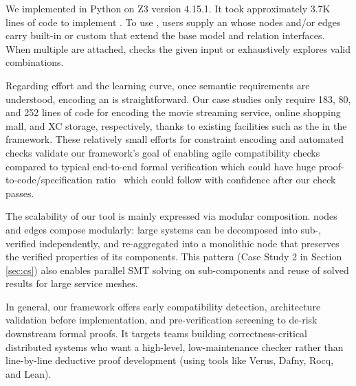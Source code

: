 We implemented \sysname{} in Python on Z3 version 4.15.1. It took
approximately 3.7K lines of code to implement \sysname{}. 
%
To use \sysname{}, users supply an \sysgraph whose nodes and/or edges carry
built-in or custom \sysmods that extend the base model and relation interfaces.
When multiple \sysmods are attached, \sysname checks the given
input or exhaustively explores valid combinations.


Regarding effort and the learning curve, once semantic requirements are understood, encoding an \sysgraph is straightforward.
Our case studies only require 183, 80, and 252 lines of code for encoding the movie streaming service, online shopping mall, and XC storage, respectively, thanks to existing facilities such as the \sysmods{} in the \sysname{} framework. 
These relatively small efforts for constraint encoding and automated checks validate our framework's goal of enabling agile compatibility checks compared to typical end-to-end formal verification which could have huge proof-to-code/specification ratio~\cite{certikos-osdi16, klein2009sel4, wormspace, ironfleet, disel} which could follow with confidence after our \sysname{} check passes. 

The scalability of our tool is mainly expressed via modular composition.
\sysgraph nodes and edges compose modularly: large systems can be decomposed into sub-\sysgraphs,
verified independently, and re-aggregated into a monolithic node that preserves the verified properties of its components.
This pattern (\eg Case Study 2 in Section \ref{sec:cs}) also enables parallel SMT solving on sub-components and 
reuse of solved results for large service meshes.

In general, our framework offers early compatibility detection,
architecture validation before implementation, and pre-verification screening to de-risk downstream formal proofs.
It targets teams building correctness-critical distributed systems who want a high-level, low-maintenance checker rather than line-by-line deductive proof development (\eg using tools like Verus\cite{verus}, Dafny\cite{dafny}, Rocq\cite{coq}, and Lean\cite{lean}).


